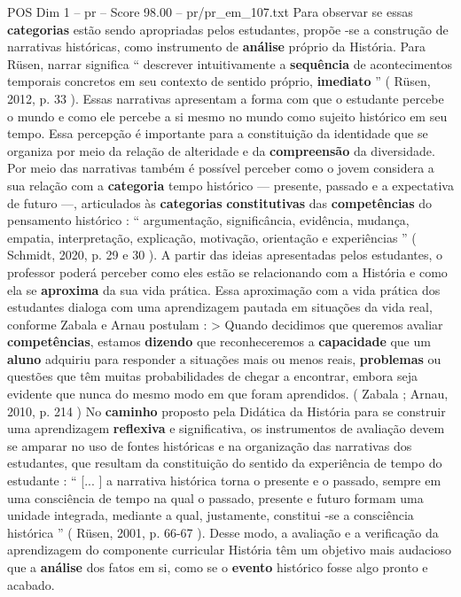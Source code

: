\begin{textsample}{POS Dim 1 – pr – Score 98.00 – pr/pr\_em\_107.txt}
Para observar se essas \textbf{categorias} estão sendo apropriadas pelos estudantes, propõe -se a construção de narrativas históricas, como instrumento de \textbf{análise} próprio da História.
Para Rüsen, narrar significa “ descrever intuitivamente a \textbf{sequência} de acontecimentos temporais concretos em seu contexto de sentido próprio, \textbf{imediato} ” ( Rüsen, 2012, p. 33 ).
Essas narrativas apresentam a forma com que o estudante percebe o mundo e como ele percebe a si mesmo no mundo como sujeito histórico em seu tempo.
Essa percepção é importante para a constituição da identidade que se organiza por meio da relação de alteridade e da \textbf{compreensão} da diversidade.
Por meio das narrativas também é possível perceber como o jovem considera a sua relação com a \textbf{categoria} tempo histórico — presente, passado e a expectativa de futuro —, articulados às \textbf{categorias} \textbf{constitutivas} das \textbf{competências} do pensamento histórico : “ argumentação, significância, evidência, mudança, empatia, interpretação, explicação, motivação, orientação e experiências ” ( Schmidt, 2020, p. 29 e 30 ).
A partir das ideias apresentadas pelos estudantes, o professor poderá perceber como eles estão se relacionando com a História e como ela se \textbf{aproxima} da sua vida prática.
Essa aproximação com a vida prática dos estudantes dialoga com uma aprendizagem pautada em situações da vida real, conforme Zabala e Arnau postulam : > Quando decidimos que queremos avaliar \textbf{competências}, estamos \textbf{dizendo} que reconheceremos a \textbf{capacidade} que um \textbf{aluno} adquiriu para responder a situações mais ou menos reais, \textbf{problemas} ou questões que têm muitas probabilidades de chegar a encontrar, embora seja evidente que nunca do mesmo modo em que foram aprendidos. ( Zabala ; Arnau, 2010, p. 214 ) No \textbf{caminho} proposto pela Didática da História para se construir uma aprendizagem \textbf{reflexiva} e significativa, os instrumentos de avaliação devem se amparar no uso de fontes históricas e na organização das narrativas dos estudantes, que resultam da constituição do sentido da experiência de tempo do estudante : “ [... ] a narrativa histórica torna o presente e o passado, sempre em uma consciência de tempo na qual o passado, presente e futuro formam uma unidade integrada, mediante a qual, justamente, constitui -se a consciência histórica ” ( Rüsen, 2001, p. 66-67 ).
Desse modo, a avaliação e a verificação da aprendizagem do componente curricular História têm um objetivo mais audacioso que a \textbf{análise} dos fatos em si, como se o \textbf{evento} histórico fosse algo pronto e acabado.

\end{textsample}
